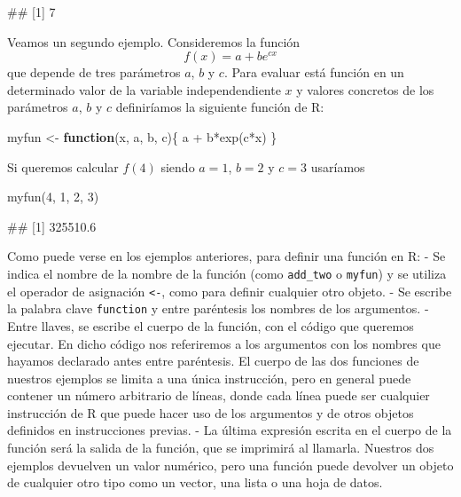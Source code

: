 \documentclass[
  title=normal,
  notoc,
  bib=normal]{mnye}
\newenvironment{Shaded}{\begin{snugshade}}{\end{snugshade}}
\newcommand{\ControlFlowTok}[1]{\textcolor[rgb]{0.13,0.29,0.53}{\textbf{#1}}}
\newcommand{\DecValTok}[1]{\textcolor[rgb]{0.00,0.00,0.81}{#1}}
\newcommand{\FunctionTok}[1]{\textcolor[rgb]{0.00,0.00,0.00}{#1}}
\newcommand{\NormalTok}[1]{#1}
\newcommand{\OtherTok}[1]{\textcolor[rgb]{0.56,0.35,0.01}{#1}}
\newcommand{\SpecialCharTok}[1]{\textcolor[rgb]{0.00,0.00,0.00}{#1}}
\begin{document}
\begin{Shaded}
\begin{Highlighting}[]
\NormalTok{\#\# [1] 7}
\end{Highlighting}
\end{Shaded}

Veamos un segundo ejemplo. Consideremos la función
\[ f(x) = a + be^{cx} \]
que depende de tres parámetros \(a\), \(b\) y \(c\). Para evaluar está función en un determinado valor de la variable independendiente \(x\) y valores concretos de los parámetros \(a\), \(b\) y \(c\) definiríamos la siguiente función de \textsf{R}:

\begin{Shaded}
\begin{Highlighting}[]
\NormalTok{myfun }\OtherTok{\textless{}{-}} \ControlFlowTok{function}\NormalTok{(x, a, b, c)\{}
\NormalTok{    a }\SpecialCharTok{+}\NormalTok{ b}\SpecialCharTok{*}\FunctionTok{exp}\NormalTok{(c}\SpecialCharTok{*}\NormalTok{x)}
\NormalTok{\}}
\end{Highlighting}
\end{Shaded}

Si queremos calcular \(f(4)\) siendo \(a = 1\), \(b = 2\) y \(c = 3\) usaríamos

\begin{Shaded}
\begin{Highlighting}[]
\FunctionTok{myfun}\NormalTok{(}\DecValTok{4}\NormalTok{, }\DecValTok{1}\NormalTok{, }\DecValTok{2}\NormalTok{, }\DecValTok{3}\NormalTok{)}
\end{Highlighting}
\end{Shaded}

\begin{Shaded}
\begin{Highlighting}[]
\NormalTok{\#\# [1] 325510.6}
\end{Highlighting}
\end{Shaded}

Como puede verse en los ejemplos anteriores, para definir una función en \textsf{R}:
- Se indica el nombre de la nombre de la función (como \texttt{add\_two} o \texttt{myfun}) y se utiliza el operador de asignación \texttt{\textless{}-}, como para definir cualquier otro objeto.
- Se escribe la palabra clave \texttt{function} y entre paréntesis los nombres de los argumentos.
- Entre llaves, se escribe el cuerpo de la función, con el código que queremos ejecutar. En dicho código nos referiremos a los argumentos con los nombres que hayamos declarado antes entre paréntesis. El cuerpo de las dos funciones de nuestros ejemplos se limita a una única instrucción, pero en general puede contener un número arbitrario de líneas, donde cada línea puede ser cualquier instrucción de \textsf{R} que puede hacer uso de los argumentos y de otros objetos definidos en instrucciones previas.
- La última expresión escrita en el cuerpo de la función será la salida de la función, que se imprimirá al llamarla. Nuestros dos ejemplos devuelven un valor numérico, pero una función puede devolver un objeto de cualquier otro tipo como un vector, una lista o una hoja de datos.
\end{document}
